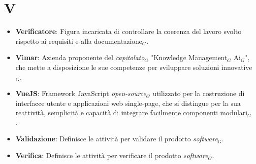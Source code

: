 \section{V}
\begin{itemize}
    \item \textbf{Verificatore}: Figura incaricata di controllare la coerenza del lavoro svolto rispetto ai requisiti e alla documentazione$_G$.
    \item \textbf{Vimar}: Azienda proponente del \textit{capitolato}$_G$ "Knowledge Management$_G$ Ai$_G$", che mette a disposizione le sue competenze per sviluppare soluzioni innovative$_G$.
    \item \textbf{VueJS}: Framework JavaScript \textit{open-source}$_G$ utilizzato per la costruzione di interfacce utente e applicazioni web single-page, che si distingue per la sua reattività, semplicità e capacità di integrare facilmente componenti modulari$_G$.
    \item \textbf{Validazione}: Definisce le attività per validare il prodotto \textit{software}$_G$.
    \item \textbf{Verifica}: Definisce le attività per verificare il prodotto \textit{software}$_G$.
\end{itemize}

